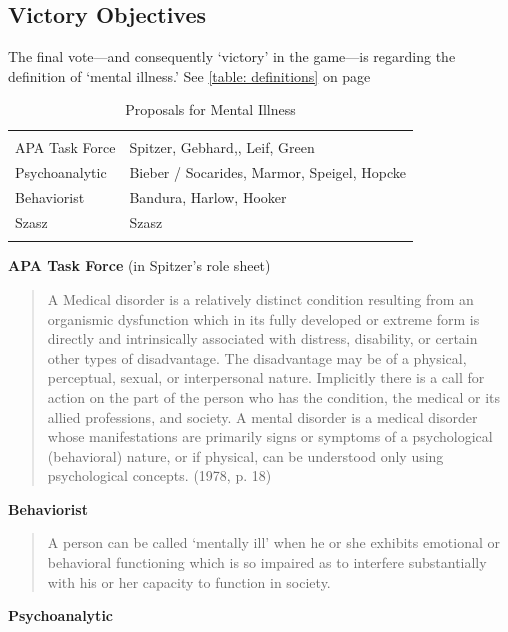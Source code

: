 \begin{refsection}
\subsection{Victory Objectives}
\label{victoryobjectives}

The final vote---and consequently `victory' in the game---is regarding the definition of `mental illness.' See \ref{table: definitions} on page \pageref{table: definitions}

 \begin{longtable}[!t]{ | P{3cm} | P{5cm} |  }
\hline
{}&
\\
APA Task Force&
Spitzer, Gebhard,, Leif, Green\\
Psychoanalytic&
Bieber / Socarides, Marmor, Speigel, Hopcke\\
Behaviorist&
Bandura, Harlow, Hooker\\
Szasz&
Szasz\\ \hline
\caption{Proposals for Mental Illness}
\label{table: mentalillness}
\end{longtable}

\textbf{APA Task Force} (in Spitzer's role sheet)

\begin{quote}

A Medical disorder is a relatively distinct condition resulting from an organismic dysfunction which in its fully developed or extreme form is directly and intrinsically associated with distress, disability, or certain other types of disadvantage. The disadvantage may be of a physical, perceptual, sexual, or interpersonal nature. Implicitly there is a call for action on the part of the person who has the condition, the medical or its allied professions, and society.
A mental disorder is a medical disorder whose manifestations are primarily signs or symptoms of a psychological (behavioral) nature, or if physical, can be understood only using psychological concepts. (1978, p. 18)
\end{quote}

\textbf{Behaviorist}

\begin{quote}

A person can be called `mentally ill' when he or she exhibits emotional or behavioral functioning which is so impaired as to interfere substantially with his or her capacity to function in society. 
\end{quote}

\textbf{Psychoanalytic} 


\end{refsection}
